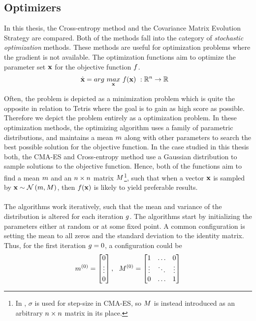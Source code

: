 \subsection{Optimizers \label{Optimizers}}

In this thesis, the Cross-entropy method and the Covariance Matrix Evolution 
Strategy are compared. Both of the methods fall into the category of 
\textit{stochastic optimization}
methods. These methods are useful for 
optimization problems where the gradient is not available.
The optimization functions aim to optimize 
the parameter set $\textbf{x}$
for the objective function $f$.
\begin{align}
\hat{\textbf{\individual }} &= 
arg \  \underset{\textbf{\individual }}{max} \  
\fitnessFunction (\textbf{\individual }) \ 
:\mathbb{R}^{\dimensions } \rightarrow \mathbb{R}
\end{align}

Often, the problem is depicted as a minimization problem which is quite
the opposite in relation to Tetris where the goal is to gain as high score as possible.
Therefore we depict the problem entirely as a optimization problem.
In these optimization methods, the optimizing algorithm uses a family of parametric distributions,
and maintains a mean $m $ along with other parameters
to search the best possible solution for the objective function.  
In the case studied in this thesis
both, the CMA-ES and Cross-entropy method use a 
Gaussian distribution to sample solutions to the objective function.
Hence, both of the functions aim to find a mean 
$m $ and an $n \times n$ matrix 
$M $\footnote{In \citep{hansen2011}, 
$\sigma$ is used for step-size in CMA-ES, so $M $ is instead introduced
as an arbitrary $n \times n$ matrix in its place.}, such that when
a vector $\textbf{x}$ is sampled by 
$\textbf{x} \sim \mathcal{N}\left( m, M \right)$, 
then $f (\textbf{x})$ 
is likely to yield preferable results.\\
\\
The algorithms work iteratively, such that the mean and variance 
of the distribution 
is altered for each iteration $g $.
The algorithms start by initializing the 
parameters either at random or at some fixed point. A common 
configuration is setting the mean to 
all zeros and the standard deviation to the identity matrix.
Thus, for the first iteration $g = 0$, a configuration could be
\begin{align}
\mean^{(0)} =
\begin{bmatrix}
0\\
\vdots\\
0
\end{bmatrix},\ \ 
\varianceMatrix^{(0)} = 
\begin{bmatrix}
1 & \hdots & 0\\
\vdots & \ddots & \vdots\\
0 & \hdots & 1
\end{bmatrix}
\end{align}

